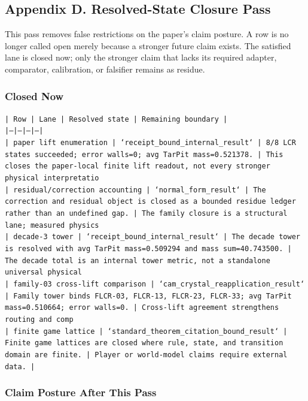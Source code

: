 \documentclass[11pt]{article}
\begin{document}
\subsection*{Appendix D. Resolved-State Closure Pass}

This pass removes false restrictions on the paper's claim posture. A row is no longer called open merely because a stronger future claim exists. The satisfied lane is closed now; only the stronger claim that lacks its required adapter, comparator, calibration, or falsifier remains as residue.

\subsubsection*{Closed Now}

\noindent\texttt{| Row | Lane | Resolved state | Remaining boundary |}\\
\noindent\texttt{|---|---|---|---|}\\
\noindent\texttt{| paper lift enumeration | `receipt\_bound\_internal\_result` | 8/8 LCR states succeeded; error walls=0; avg TarPit mass=0.521378. | This closes the paper-local finite lift readout, not every stronger physical interpretatio}\\
\noindent\texttt{| residual/correction accounting | `normal\_form\_result` | The correction and residual object is closed as a bounded residue ledger rather than an undefined gap. | The family closure is a structural lane; measured physics}\\
\noindent\texttt{| decade-3 tower | `receipt\_bound\_internal\_result` | The decade tower is resolved with avg TarPit mass=0.509294 and mass sum=40.743500. | The decade total is an internal tower metric, not a standalone universal physical }\\
\noindent\texttt{| family-03 cross-lift comparison | `cam\_crystal\_reapplication\_result` | Family tower binds FLCR-03, FLCR-13, FLCR-23, FLCR-33; avg TarPit mass=0.510664; error walls=0. | Cross-lift agreement strengthens routing and comp}\\
\noindent\texttt{| finite game lattice | `standard\_theorem\_citation\_bound\_result` | Finite game lattices are closed where rule, state, and transition domain are finite. | Player or world-model claims require external data. |}\\

\subsubsection*{Claim Posture After This Pass}
\end{document}

